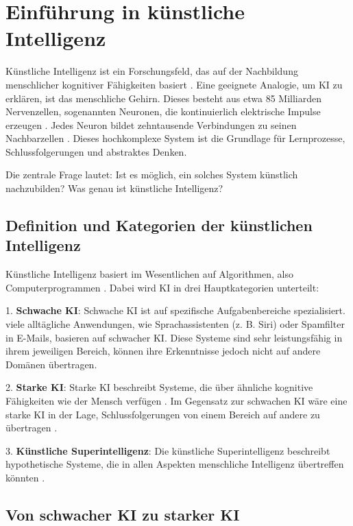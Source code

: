 
\section{Einführung in künstliche Intelligenz}

Künstliche Intelligenz ist ein Forschungsfeld, das auf der Nachbildung menschlicher kognitiver Fähigkeiten basiert \cite{Amit.2018, Koricanac.2021, Zhang.2023}. Eine geeignete Analogie, um KI zu erklären, ist das menschliche Gehirn. Dieses besteht aus etwa 85 Milliarden Nervenzellen, sogenannten Neuronen, die kontinuierlich elektrische Impulse erzeugen \cite{Amit.2018}. Jedes Neuron bildet zehntausende Verbindungen zu seinen Nachbarzellen \cite{Amit.2018}. Dieses hochkomplexe System ist die Grundlage für Lernprozesse, Schlussfolgerungen und abstraktes Denken.  

Die zentrale Frage lautet: Ist es möglich, ein solches System künstlich nachzubilden? Was genau ist künstliche Intelligenz?  

\subsection{Definition und Kategorien der künstlichen Intelligenz}

Künstliche Intelligenz basiert im Wesentlichen auf Algorithmen, also Computerprogrammen \cite{Amit.2018, Koricanac.2021, Zhang.2023}. Dabei wird KI in drei Hauptkategorien unterteilt:

1. \textbf{Schwache KI}:  
   Schwache KI ist auf spezifische Aufgabenbereiche spezialisiert\cite{Funk.2022}. viele alltägliche Anwendungen, wie Sprachassistenten (z. B. Siri) oder Spamfilter in E-Mails, basieren auf schwacher KI. Diese Systeme sind sehr leistungsfähig in ihrem jeweiligen Bereich, können ihre Erkenntnisse jedoch nicht auf andere Domänen übertragen.

2. \textbf{Starke KI}:  
   Starke KI beschreibt Systeme, die über ähnliche kognitive Fähigkeiten wie der Mensch verfügen \cite{Funk.2022}. Im Gegensatz zur schwachen KI wäre eine starke KI in der Lage, Schlussfolgerungen von einem Bereich auf andere zu übertragen \cite{Funk.2022}.

3. \textbf{Künstliche Superintelligenz}:  
   Die künstliche Superintelligenz beschreibt hypothetische Systeme, die in allen Aspekten menschliche Intelligenz übertreffen könnten \cite{Funk.2022}.

\subsection{Von schwacher KI zu starker KI}

